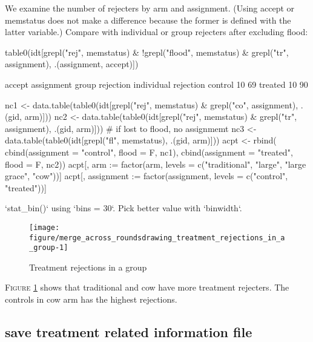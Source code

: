 We examine the number of rejecters by arm and assignment. (Using \textsf{accept} or \textsf{memstatus} does not make a difference because the former is defined with the latter variable.) Compare with individual or group rejecters after excluding flood:
\begin{Schunk}
\begin{Sinput}
table0(idt[grepl("rej", memstatus) & !grepl("flood", memstatus) & 
	grepl("tr", assignment), .(assignment, accept)])
\end{Sinput}
\begin{Soutput}
          accept
assignment group rejection individual rejection
   control              10                   69
   treated              10                   90
\end{Soutput}
\begin{Sinput}
nc1 <- data.table(table0(idt[grepl("rej", memstatus) & grepl("co", assignment), .(gid, arm)]))
nc2 <- data.table(table0(idt[grepl("rej", memstatus) & grepl("tr", assignment), .(gid, arm)]))
# if lost to flood, no assignmemt
nc3 <- data.table(table0(idt[grepl("fl", memstatus), .(gid, arm)]))
acpt <- rbind(
	cbind(assignment = "control", flood = F, nc1),
	cbind(assignment = "treated", flood = F, nc2))
acpt[, arm := factor(arm, levels = c("traditional", "large", "large grace", "cow"))]
acpt[, assignment := factor(assignment, levels = c("control", "treated"))]
\end{Sinput}
\end{Schunk}
\begin{Schunk}
\begin{Soutput}
`stat_bin()` using `bins = 30`. Pick better value with `binwidth`.
\end{Soutput}
\begin{figure}

{\centering \texttt{[image: figure/merge\_across\_roundsdrawing\_treatment\_rejections\_in\_a\_group-1]} 

}

\caption[Treatment rejections in a group]{Treatment rejections in a group}\label{fig: drawing treatment rejections in a group}
\end{figure}
\end{Schunk}
\textsc{\small Figure \ref{fig: drawing treatment rejections in a group}} shows that \textsf{traditional} and \textsf{cow} have more treatment rejecters. The controls in \textsf{cow} arm has the highest rejections.


\subsection{save treatment related information file}

